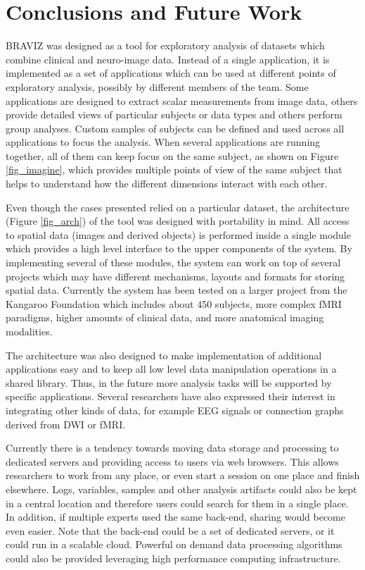 \documentclass[twocolumn]{svjour3}
\begin{document}
\section{Conclusions and Future Work}

BRAVIZ was designed as a tool for exploratory analysis of datasets which combine clinical and neuro-image data. Instead of a single application, it is implemented as a set of applications which can be used at different points of exploratory analysis, possibly by different members of the team. Some applications are designed to extract scalar measurements from image data, others provide detailed views of particular subjects or data types and others perform group analyses. Custom samples of subjects can be defined and used across all applications to focus the analysis. When several applications are running together, all of them can keep focus on the same subject, as shown on Figure \ref{fig_imagine}, which provides multiple points of view of the same subject that helps to understand how the different dimensions interact with each other. 

Even though the cases presented relied on a particular dataset, the architecture (Figure \ref{fig_arch}) of the tool was designed with portability in mind. All access to spatial data (images and derived objects) is performed inside a single module which provides a high level interface to the upper components of the system. By implementing several of these modules, the system can work on top of several projects which may have different mechanisms, layouts and formats for storing spatial data. Currently the system has been tested on a larger project from the Kangaroo Foundation which includes about 450 subjects, more complex fMRI paradigms, higher amounts of clinical data, and more anatomical imaging modalities.  

The architecture was also designed to make implementation of additional applications easy and to keep all low level data manipulation operations in a shared library. Thus, in the future more analysis tasks will be supported by specific applications. Several researchers have also expressed their interest in integrating other kinds of data, for example EEG signals or connection graphs \cite{rubinov_complex_2010} derived from DWI or fMRI. 

Currently there is a tendency towards moving data storage and processing to dedicated servers and providing access to users via web browsers. This allows researchers to work from any place, or even start a session on one place and finish elsewhere. Logs, variables, samples and other analysis artifacts could also be kept in a central location and therefore users could search for them in a single place. In addition, if multiple experts used the same back-end, sharing would become even easier. Note that the back-end could be a set of dedicated servers, or it could run in a scalable cloud. Powerful on demand data processing algorithms could also be provided leveraging high performance computing infrastructure. 
\end{document}
